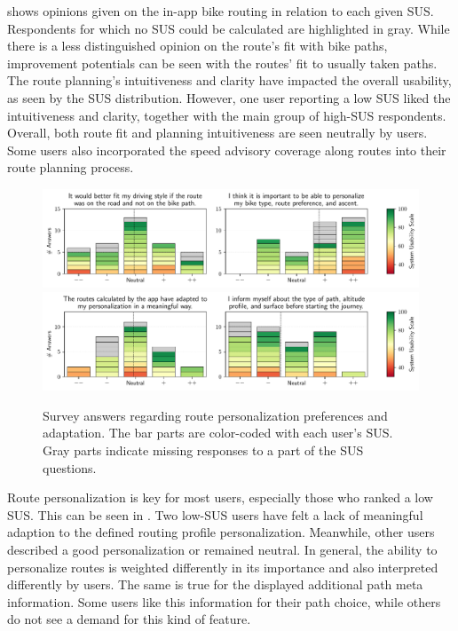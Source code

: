  shows opinions given on the in-app bike routing in relation to each given SUS. Respondents for which no SUS could be calculated are highlighted in gray. While there is a less distinguished opinion on the route's fit with bike paths, improvement potentials can be seen with the routes' fit to usually taken paths. The route planning's intuitiveness and clarity have impacted the overall usability, as seen by the SUS distribution. However, one user reporting a low SUS liked the intuitiveness and clarity, together with the main group of high-SUS respondents. Overall, both route fit and planning intuitiveness are seen neutrally by users. Some users also incorporated the speed advisory coverage along routes into their route planning process.

\begin{figure}[t]
\caption{Survey answers regarding route personalization preferences and adaptation. The bar parts are color-coded with each user's SUS. Gray parts indicate missing responses to a part of the SUS questions.}\label{fig:route-personalization}
\includegraphics[width=\linewidth]{images/app-usability-questions-route-personalization.pdf}
\\
\includegraphics[width=\linewidth]{images/app-usability-questions-route-personalization-adaptation.pdf}
\end{figure}

Route personalization is key for most users, especially those who ranked a low SUS. This can be seen in . Two low-SUS users have felt a lack of meaningful adaption to the defined routing profile personalization. Meanwhile, other users described a good personalization or remained neutral. In general, the ability to personalize routes is weighted differently in its importance and also interpreted differently by users. The same is true for the displayed additional path meta information. Some users like this information for their path choice, while others do not see a demand for this kind of feature. 

